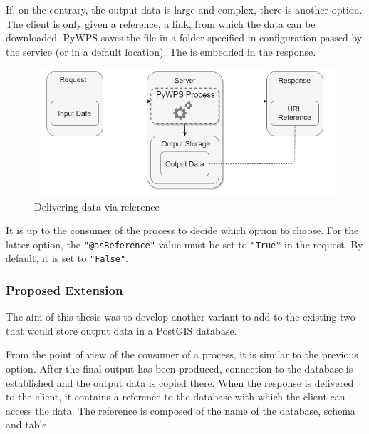 If, on the contrary, the output data is large and complex, there is another option. The client is only given a reference, a  link, from which the data can be downloaded. PyWPS saves the file in a folder specified in configuration passed by the service (or in a default location). The  is embedded in the  response. \cite{pywpsurl}

\begin{figure}[H] \centering
      \includegraphics[width=370pt]{./pictures/optiontwo.png}
      \caption[Delivering data via  reference]{Delivering data via  reference}
      \label{fig:optiontwo}
  \end{figure}

It is up to the consumer of the process to decide which option to choose. For the latter option, the \texttt{"@asReference"} value must be set to \texttt{"True"}  in the request. \cite{asref} By default, it is set to \texttt{"False"}.


\subsubsection{Proposed Extension} 

The aim of this thesis was to develop another variant to add to the existing two that would store output data in a PostGIS database.

From the point of view of the consumer of a process, it is similar to the previous option. After the final output has been produced, connection to the database is established and the output data is copied there. When the  response is delivered to the client, it contains a reference to the database with which the client can access the data. The reference is composed of the name of the database, schema and table. 


